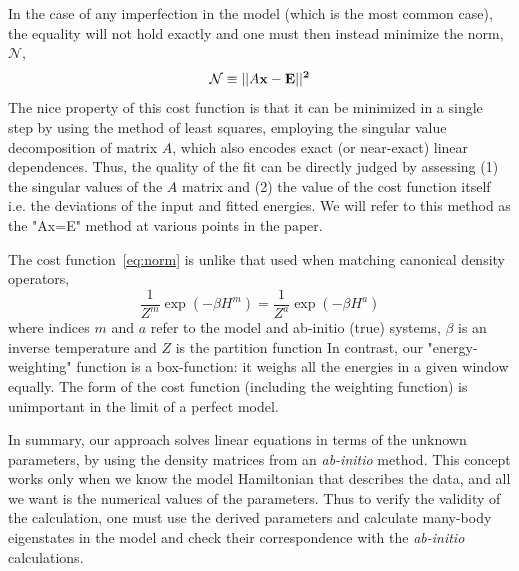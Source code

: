 \documentclass[prl,12pt,onecolumn,nofootinbib,notitlepage,english,superscriptaddress]{revtex4-1}
\begin{document}
In the case of any imperfection in the model (which is the most common case), 
the equality will not hold exactly 
and one must then instead minimize the norm, $\mathcal{N}$,
\begin{equation}
	\mathcal{N} \equiv ||A\bf{x}-\bf{E}||^2
\label{eq:norm}
\end{equation}
The nice property of this cost function is that it can be minimized
in a single step by using the method of least squares, employing the singular 
value decomposition of matrix $A$, which also encodes exact (or near-exact) linear dependences. 
Thus, the quality of the fit can be directly judged 
by assessing (1) the singular values of the $A$ matrix and (2) 
the value of the cost function itself i.e. the deviations of the input and fitted energies.
We will refer to this method as the "Ax=E" method at various points in the paper.

The cost function~\eqref{eq:norm} is unlike that used when matching 
canonical density operators,
\begin{equation} 
\frac{1} {Z^{m}} \exp(-\beta H^{m})  = \frac{1} {Z^{a}} \exp(-\beta H^{a})
\label{eq:Z_Zstar}
\end {equation}
where indices $m$ and $a$ refer to the model and ab-initio (true) systems, $\beta$ 
is an inverse temperature and $Z$ is the partition function
In contrast, our "energy-weighting" function is a box-function: it weighs all the energies 
in a given window equally. The form of the cost function (including the 
weighting function) is unimportant in the limit of a perfect model.

In summary, our approach solves 
linear equations in terms of the unknown parameters, by using the density matrices 
from an \emph{ab-initio} method. This concept works only when we 
know the model Hamiltonian that describes the data, and all we want is the numerical 
values of the parameters. Thus to verify the validity of the calculation, 
one must use the derived parameters and calculate many-body eigenstates 
in the model and check their correspondence with the \emph{ab-initio} 
calculations.
\end{document}
